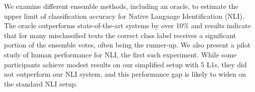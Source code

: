 We examine different ensemble methods, including an oracle, to estimate the upper limit of classification accuracy for Native Language Identification (NLI). The oracle outperforms state-of-the-art systems by over 10\% and results indicate that for many misclassified texts the correct class label receives a significant portion of the ensemble votes, often being the runner-up.  We also present a pilot study of human performance for NLI, the first such experiment. While some participants achieve modest results on our simplified setup with 5 L1s, they did not outperform our NLI system, and this performance gap is likely to widen on the standard NLI setup.
